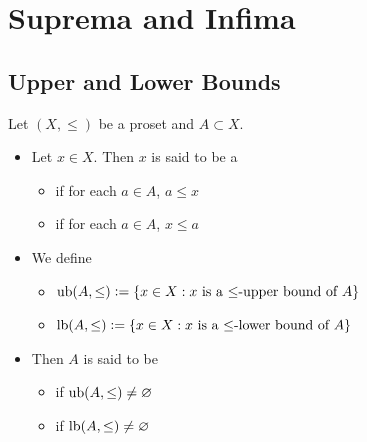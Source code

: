 \documentclass{book}
\begin{document}
	
	
	
	
	
	
	
	
	
	
	
	
	
	
	
	
	
	
	
	
	
	
	
	
	
	
	
	
	
	
	
	
	
	
	\newpage
	\chapter{Suprema and Infima}
	
	\section{Upper and Lower Bounds}
	
	\begin{defn} 
		Let $(X, \leq)$ be a proset and $A \subset X$. 
		\begin{itemize}
			\item Let $x \in X$. Then $x$ is said to be a
			\begin{itemize}
				\item {} if for each $a \in A$, $a \leq x$
				\item {} if for each $a \in A$, $x \leq a$
			\end{itemize} 
			\item We define 
			\begin{itemize}
				\item $\operatorname{ub} (A, \leq) \vcentcolon= \{x \in X: \text{$x$ is a $\leq$-upper bound of $A$}\}$ 
				\item $\operatorname{lb}(A, \leq) \vcentcolon= \{x \in X: \text{$x$ is a $\leq$-lower bound of $A$}\}$ 
			\end{itemize} 
			\item Then $A$ is said to be 
			\begin{itemize}
				\item {} if $\operatorname{ub}(A, \leq) \neq \varnothing$
				\item {} if $\operatorname{lb}(A, \leq) \neq \varnothing$
			\end{itemize}
		\end{itemize}
	\end{defn}
	
\end{document}
